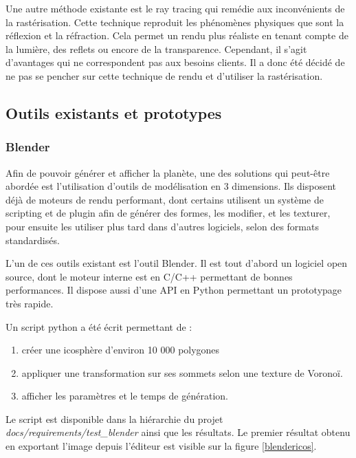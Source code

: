 \documentclass[a4paper]{article}
\begin{document}
Une autre méthode existante est le ray tracing qui remédie aux inconvénients de la rastérisation. Cette technique reproduit les phénomènes physiques que sont la réflexion et la réfraction. Cela permet un rendu plus réaliste en tenant compte de la lumière, des reflets ou encore de la transparence. Cependant, il s'agit d'avantages qui ne correspondent pas aux besoins clients. Il a donc été décidé de ne pas se pencher sur cette technique de rendu et d'utiliser la rastérisation.
        
\subsection{Outils existants et prototypes}

\subsubsection{Blender}

Afin de pouvoir générer et afficher la planète, une des solutions qui peut-être abordée est l'utilisation d'outils de modélisation en 3 dimensions. Ils disposent déjà de moteurs de rendu performant, dont certains utilisent un système de scripting et de plugin afin de générer des formes, les modifier, et les texturer, pour ensuite les utiliser plus tard dans d'autres logiciels, selon des formats standardisés.

L'un de ces outils existant est l'outil Blender. Il est tout d'abord un logiciel open source, dont le moteur interne est en C/C++ permettant de bonnes performances. Il dispose aussi d'une API en Python permettant un prototypage très rapide.

Un script python a été écrit permettant de :
\begin{enumerate}
            \item {créer une icosphère d'environ 10 000 polygones}
            \item {appliquer une transformation sur ses sommets selon une texture de Voronoï.}
            \item {afficher les paramètres et le temps de génération.}
\end{enumerate}

Le script est disponible dans la hiérarchie du projet \textit{docs/requirements/test\_blender} ainsi que les résultats. Le premier résultat obtenu en exportant l'image depuis l'éditeur est visible sur la figure \ref{blendericos}.\\
\end{document}
